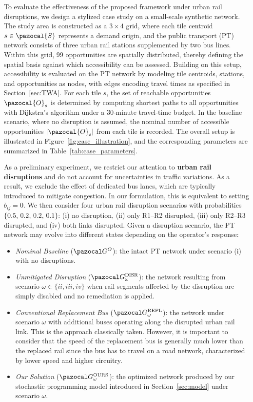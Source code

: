 \documentclass[3p,times,procedia]{elsarticle}
\begin{document}
To evaluate the effectiveness of the proposed framework under urban rail disruptions, we design a stylized case study on a small-scale synthetic network. The study area is constructed as a \(3 \times 4\) grid, where each tile centroid \(s \in \pazocal{S}\) represents a demand origin, and the public transport (PT) network consists of three urban rail stations supplemented by two bus lines. Within this grid, 99 opportunities are spatially distributed, thereby defining the spatial basis against which accessibility can be assessed. Building on this setup, accessibility is evaluated on the PT network by modeling tile centroids, stations, and opportunities as nodes, with edges encoding travel times as specified in Section~\ref{sec:TWA}. For each tile \(s\), the set of reachable opportunities \(\pazocal{O}_s\) is determined by computing shortest paths to all opportunities with Dijkstra’s algorithm under a 30-minute travel-time budget. In the baseline scenario, where no disruption is assumed, the nominal number of accessible opportunities \(|\pazocal{O}_s|\) from each tile is recorded. The overall setup is illustrated in Figure~\ref{fig:case_illustration}, and the corresponding parameters are summarized in Table~\ref{tab:case_parameters}.

As a preliminary experiment, we restrict our attention to \textbf{urban rail disruptions} and do not account for uncertainties in traffic variations. As a result, we exclude the effect of dedicated bus lanes, which are typically introduced to mitigate congestion. In our formulation, this is equivalent to setting $b_{ij} = 0$.
%
We then consider four urban rail disruption scenarios with probabilities 
\(\{0.5,\,0.2,\,0.2,\,0.1\}\): 
(i) no disruption, (ii) only R1--R2 disrupted, (iii) only R2--R3 disrupted, and (iv) both links disrupted. 
%
Given a disruption scenario, the PT network may evolve into different states depending on the operator’s response:
\begin{itemize}
    \item \emph{Nominal Baseline} (\(\pazocal G^O\)): the intact PT network under scenario (i) with no disruptions. 
    \item \emph{Unmitigated Disruption} (\(\pazocal G^\text{DISR}_\omega\)): the network resulting from scenario \(\omega\in\{ii,iii,iv\}\) when rail segments affected by the disruption are simply disabled and no remediation is applied. 
    \item \emph{Conventional Replacement Bus} (\(\pazocal G^\text{REPL}_\omega\)): the network under scenario \(\omega\) with additional buses operating along the disrupted urban rail link. This is the approach classically taken. However, it is important to consider that the speed of the replacement bus is generally much lower than the replaced rail since the bus has to travel on a road network, characterized by lower speed and higher circuitry.
    \item \emph{Our Solution} (\(\pazocal G^\text{OURS}_\omega\)): the optimized network produced by our stochastic programming model introduced in Section~\ref{sec:model} under scenario \(\omega\).
\end{itemize}
\end{document}
